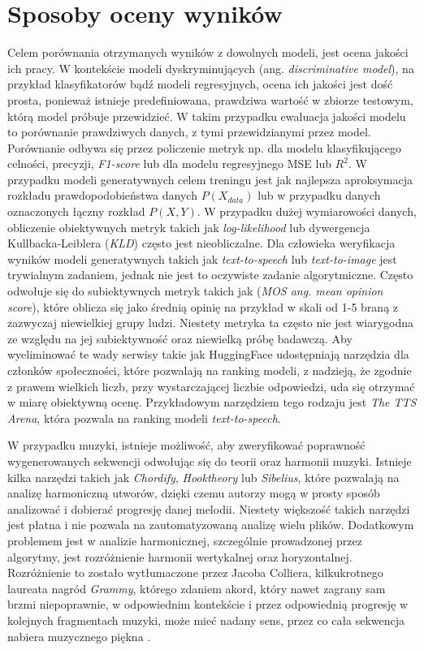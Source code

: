 \documentclass[data-science]{agh-wi} %
\begin{document}
\section{Sposoby oceny wyników}
Celem porównania otrzymanych wyników z dowolnych modeli, jest ocena jakości ich pracy. W kontekście modeli dyskryminujących (ang. \textit{discriminative model}), na przykład klasyfikatorów bądź modeli regresyjnych, ocena ich jakości jest dość prosta, ponieważ istnieje predefiniowana, prawdziwa wartość w zbiorze testowym, którą model próbuje przewidzieć. W takim przypadku ewaluacja jakości modelu to porównanie prawdziwych danych, z tymi przewidzianymi przez model. Porównanie odbywa się przez policzenie metryk np. dla modelu klasyfikującego celności, precyzji, \textit{F1-score} lub dla modelu regresyjnego MSE lub $R^2$. W przypadku modeli generatywnych celem treningu jest jak najlepsza aproksymacja rozkładu prawdopodobieństwa danych $P(X_{data})$ lub w przypadku danych oznaczonych łączny rozkład $P(X, Y)$. W przypadku dużej wymiarowości danych, obliczenie obiektywnych metryk takich jak \textit{log-likelihood} lub dywergencja Kullbacka-Leiblera (\textit{KLD}) często jest nieobliczalne. Dla człowieka weryfikacja wyników modeli generatywnych takich jak \textit{text-to-speech} lub \textit{text-to-image} jest trywialnym zadaniem, jednak nie jest to oczywiste zadanie algorytmiczne. Często odwołuje się do subiektywnych metryk takich jak (\textit{MOS ang. mean opinion score}), które oblicza się jako średnią opinię na przykład w skali od 1-5 braną z zazwyczaj niewielkiej grupy ludzi. Niestety metryka ta często nie jest wiarygodna ze względu na jej subiektywność oraz niewielką próbę badawczą. Aby wyeliminować te wady serwisy takie jak HuggingFace udostępniają narzędzia dla członków społeczności, które pozwalają na ranking modeli, z nadzieją, że zgodnie z prawem wielkich liczb, przy wystarczającej liczbie odpowiedzi, uda się otrzymać w miarę obiektywną ocenę. Przykładowym narzędziem tego rodzaju jest \textit{The TTS Arena}\cite{tts_arena}, która pozwala na ranking modeli \textit{text-to-speech}.

W przypadku muzyki, istnieje możliwość, aby zweryfikować poprawność wygenerowanych sekwencji odwołując się do teorii oraz harmonii muzyki. Istnieje kilka narzędzi takich jak \textit{Chordify}, \textit{Hooktheory} lub \textit{Sibelius}, które pozwalają na analizę harmoniczną utworów, dzięki czemu autorzy mogą w prosty sposób analizować i dobierać progresję danej melodii. Niestety większość takich narzędzi jest płatna i nie pozwala na zautomatyzowaną analizę wielu plików. Dodatkowym problemem jest w analizie harmonicznej, szczególnie prowadzonej przez algorytmy, jest rozróżnienie harmonii wertykalnej oraz horyzontalnej. Rozróżnienie to zostało wytłumaczone przez Jacoba Colliera, kilkukrotnego laureata nagród \textit{Grammy}, którego zdaniem akord, który nawet zagrany sam brzmi niepoprawnie, w odpowiednim kontekście i przez odpowiednią progresję w kolejnych fragmentach muzyki, może mieć nadany sens, przez co cała sekwencja nabiera muzycznego piękna \cite{collier_wrongnote}.
\end{document}
